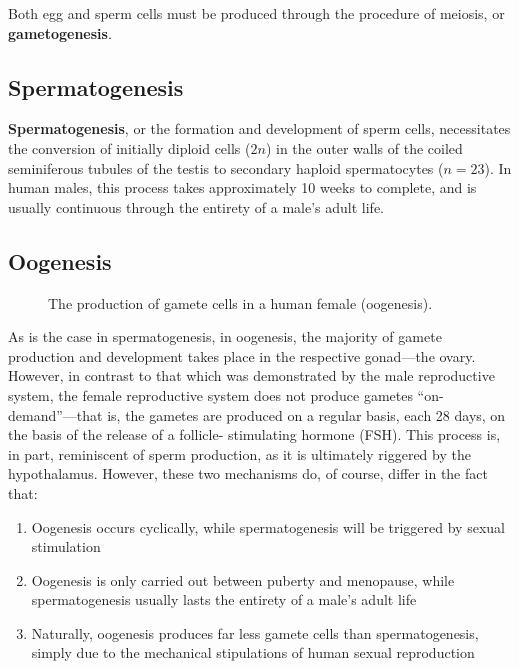 \documentclass{article}
\begin{document}
Both egg and sperm cells must be produced through the procedure of meiosis, or
\textbf{gametogenesis}.

\subsection{Spermatogenesis}

\textbf{Spermatogenesis}, or the formation and development of sperm cells,
necessitates the conversion of initially diploid cells ($2n$) in the outer
walls of the coiled seminiferous tubules of the testis to secondary haploid
spermatocytes ($n = 23$). In human males, this process takes approximately
10 weeks to complete, and is usually continuous through the entirety of a
male's adult life.

\subsection{Oogenesis}

\begin{figure}
	\centering
	\caption{The production of gamete cells in a human female (oogenesis).}
\end{figure}

As is the case in spermatogenesis, in oogenesis, the majority of gamete
production and development takes place in the respective gonad---the
ovary. However, in contrast to that which was demonstrated by the male
reproductive system, the female reproductive system does not produce
gametes ``on-demand''---that is, the gametes are produced on a regular
basis, each 28 days, on the basis of the release of a follicle-
stimulating hormone (FSH). This process is, in part, reminiscent of
sperm production, as it is ultimately riggered by the hypothalamus.
However, these two mechanisms do, of course, differ in the fact that:

\begin{enumerate}
	\item Oogenesis occurs cyclically, while spermatogenesis
		will be triggered by sexual stimulation
	\item Oogenesis is only carried out between puberty and menopause,
		while spermatogenesis usually lasts the entirety of a male's
		adult life
	\item Naturally, oogenesis produces far less gamete cells than
		spermatogenesis, simply due to the mechanical stipulations
		of human sexual reproduction
\end{enumerate}
\end{document}

